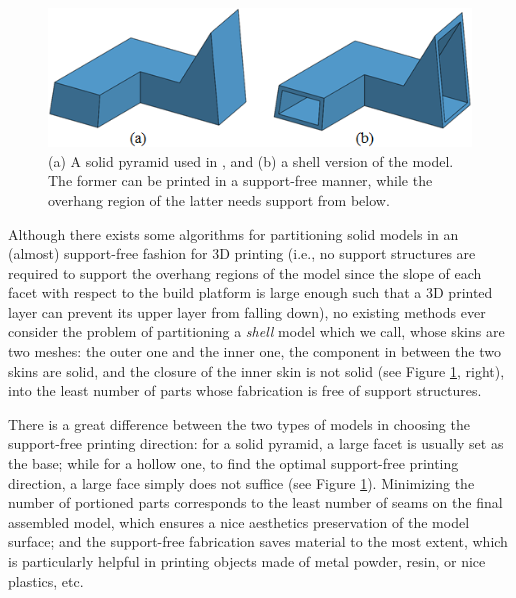 \begin{figure}[t!]
  \centering
  \includegraphics[width=\linewidth]{figs/solid_hollow.png}
  \caption{\label{fig:solid_hollow}%
  (a) A solid pyramid used in \cite{Hu_siga14}, and (b) a shell version of the model. The former can be printed in a support-free manner, while {\color{red}the overhang region} of the latter needs support from below.}
\end{figure}

{{Although there exists some algorithms for partitioning solid models in an (almost) support-free fashion \cite{Hu_siga14} for 3D printing ({\color{blue}i.e., no support structures are required to support the overhang regions of the model since the slope of each facet with respect to the build platform is large enough such that a 3D printed layer can prevent its upper layer from falling down}), no existing methods ever consider the problem of partitioning a \emph{shell} model which we call, {\color{blue} whose skins are two meshes: the outer one and the inner one, the component in between the two skins are solid, and the closure of the inner skin is not solid (see Figure \ref{fig:solid_hollow}, right),} into the least number of parts whose fabrication is free of support structures. 



There is a great difference between the two types of models in choosing the support-free printing direction: for a solid pyramid, a large facet is usually set as the base; while for a hollow one, to find the optimal support-free printing direction, a large face simply does not suffice (see Figure \ref{fig:solid_hollow}). Minimizing the number of portioned parts corresponds to the least number of seams on the final assembled model, which ensures a nice aesthetics preservation of the model surface; and the support-free fabrication saves material to the most extent, which is particularly helpful in printing objects made of metal powder, resin, or nice plastics, etc.}}



